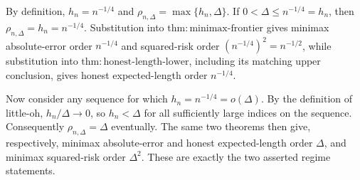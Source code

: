 By definition, \(h_n=n^{-1/4}\) and \(\rho_{n,\Delta}=\max\{h_n,\Delta\}\).  If \(0<\Delta\leq n^{-1/4}=h_n\), then \(\rho_{n,\Delta}=h_n=n^{-1/4}\).  Substitution into \(\mathrm{thm:minimax\text{-}frontier}\) gives minimax absolute-error order \(n^{-1/4}\) and squared-risk order \((n^{-1/4})^2=n^{-1/2}\), while substitution into \(\mathrm{thm:honest\text{-}length\text{-}lower}\), including its matching upper conclusion, gives honest expected-length order \(n^{-1/4}\).

Now consider any sequence for which \(h_n=n^{-1/4}=o(\Delta)\).  By the definition of little-oh, \(h_n/\Delta\to0\), so \(h_n<\Delta\) for all sufficiently large indices on the sequence.  Consequently \(\rho_{n,\Delta}=\Delta\) eventually.  The same two theorems then give, respectively, minimax absolute-error and honest expected-length order \(\Delta\), and minimax squared-risk order \(\Delta^2\).  These are exactly the two asserted regime statements.